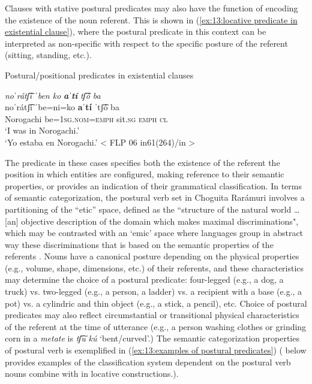 


Clauses with stative postural predicates may also have the function of encoding the existence of the noun referent. This is shown in (\ref{ex:13:locative predicate in existential clause}), where the postural predicate in this context can be interpreted as non-specific with respect to the specific posture of the referent (sitting, standing, etc.).

\ea\label{ex:13:locative predicate in existential clause}
{Postural/positional predicates in existential clauses}

    {\textit{noˈrátʃ͡i  ˈben     ko} \textbf{\textit{aˈtí} }\textit{tʃ͡ó   ba}}\\
    \gll    noˈrátʃ͡i ˈbe=ni=ko  \textbf{aˈtí}  ˈtʃ͡ó  ba\\
            Norogachi  be=1\textsc{sg.nom}=\textsc{emph}  {sit\textsc{.sg}}  \textsc{emph}  \textsc{cl} \\
    \glt    ‘I was in Norogachi.’\\
    \glt    `Yo estaba en Norogachi.’  < FLP 06 in61(264)/in >\\

\z


The predicate in these cases specifies both the existence of the referent the position in which entities are configured, making reference to their semantic properties, or provides an indication of their grammatical classification. In terms of semantic categorization, the postural verb set in Choguita Rarámuri involves a partitioning of the ``etic'' space, defined as the ``structure of the natural world \ldots\, [an] objective description of the domain which makes maximal discriminations", which may be contrasted with an `emic' space where languages group in abstract way these discriminations that is based on the semantic properties of the referents \citep[][8]{levinson2006grammars}. Nouns have a canonical posture depending on the physical properties (e.g., volume, shape, dimensions, etc.) of their referents, and these characteristics may determine the choice of a postural predicate: four-legged (e.g., a dog, a truck) vs. two-legged (e.g., a person, a ladder) vs. a recipient with a base (e.g., a pot) vs. a cylindric and thin object (e.g., a stick, a pencil), etc. Choice of postural predicates may also reflect circumstantial or transitional physical characteristics of the referent at the time of utterance (e.g., a person washing clothes or grinding corn in a \textit{metate} is \textit{tʃ͡uˈkú} ‘bent/curved’.) The semantic categorization properties of postural verb is exemplified in (\ref{ex:13:examples of postural predicates}) ( below provides examples of the classification system dependent on the postural verb nouns combine with in locative constructions.).

